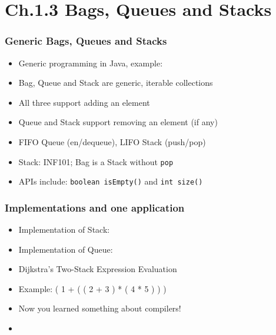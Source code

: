 \documentclass[handout]{beamer}
\newcommand{\git}{https://github.com/marcbezem/INF102/blob/master}
\begin{document}
\section{Ch.1.3 Bags, Queues and Stacks}

\frame
  {
    
    \frametitle{Generic Bags, Queues and Stacks}

\begin{itemize}[<+->]
\item Generic programming in Java, example: 
 \href{\git/programs/oddsAndEnds/PolyPair.java}%
{\color{red}{PolyPair.java}}
\item Bag, Queue and Stack are generic, iterable collections
\item All three support adding an element
\item Queue and Stack support removing an element (if any)
\item FIFO Queue (en/dequeue), LIFO Stack (push/pop)
\item Stack: INF101; Bag is a Stack without {\tt pop}
\item APIs include: {\tt boolean isEmpty()} and {\tt int size()}
\end{itemize}
}

\frame
  {
    
    \frametitle{Implementations and one application}

\begin{itemize}[<+->]

\item Implementation of Stack:
\href{\git/programs/fundamentals/bagsQueuesAndStacks/LinkedList_Stack.java}%
{\color{red}{LinkedList\_Stack.java}}
\item Implementation of Queue:
\href{\git/programs/fundamentals/bagsQueuesAndStacks/LinkedList_Queue.java}%
{\color{red}{LinkedList\_Queue.java}}
\item Dijkstra's Two-Stack Expression Evaluation
\item Example:  ( 1 + (  ( 2 + 3 )  *  ( 4 * 5 ) ) )
\item Now you learned something about compilers!
\item \href{http://algs4.cs.princeton.edu/lectures/13DemoDijkstraTwoStack.mov}{\color{red}{Movie}}
\end{itemize}
}
\end{document}
